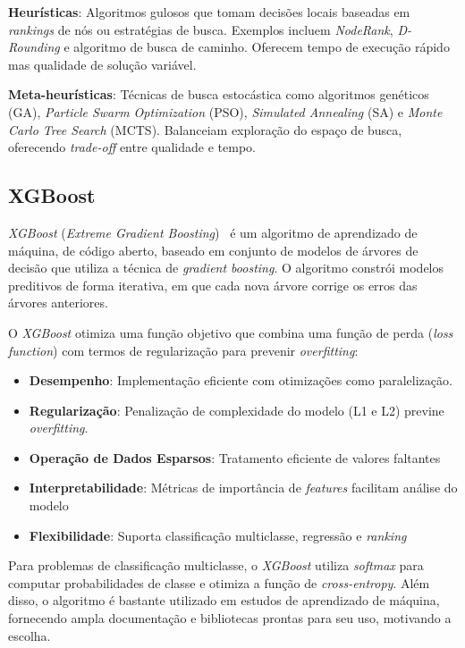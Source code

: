 \documentclass[conference]{IEEEtran}
\begin{document}
\textbf{Heurísticas}: Algoritmos gulosos que tomam decisões locais baseadas em \textit{rankings} de nós ou estratégias de busca. Exemplos incluem \textit{NodeRank}, \textit{D-Rounding} e algoritmo de busca de caminho. Oferecem tempo de execução rápido mas qualidade de solução variável.

\textbf{Meta-heurísticas}: Técnicas de busca estocástica como algoritmos genéticos (GA), \textit{Particle Swarm Optimization} (PSO), \textit{Simulated Annealing} (SA) e \textit{Monte Carlo Tree Search} (MCTS). Balanceiam exploração do espaço de busca, oferecendo \textit{trade-off} entre qualidade e tempo.

\subsection{XGBoost}

\textit{XGBoost} (\textit{Extreme Gradient Boosting})~\cite{chen2016xgboost} é um algoritmo de aprendizado de máquina, de código aberto, baseado em conjunto de modelos de árvores de decisão que utiliza a técnica de \textit{gradient boosting}. O algoritmo constrói modelos preditivos de forma iterativa, em que cada nova árvore corrige os erros das árvores anteriores.

O \textit{XGBoost} otimiza uma função objetivo que combina uma função de perda (\textit{loss function}) com termos de regularização para prevenir \textit{overfitting}:

\begin{itemize}
    \item \textbf{Desempenho}: Implementação eficiente com otimizações como paralelização.
    \item \textbf{Regularização}: Penalização de complexidade do modelo (L1 e L2) previne \textit{overfitting}.
    \item \textbf{Operação de Dados Esparsos}: Tratamento eficiente de valores faltantes
    \item \textbf{Interpretabilidade}: Métricas de importância de \textit{features} facilitam análise do modelo
    \item \textbf{Flexibilidade}: Suporta classificação multiclasse, regressão e \textit{ranking}
\end{itemize}

Para problemas de classificação multiclasse, o \textit{XGBoost} utiliza \textit{softmax} para computar probabilidades de classe e otimiza a função de \textit{cross-entropy}.
Além disso, o algoritmo é bastante utilizado em estudos de aprendizado de máquina, fornecendo ampla documentação e bibliotecas prontas para seu uso, motivando
a escolha.
\end{document}
